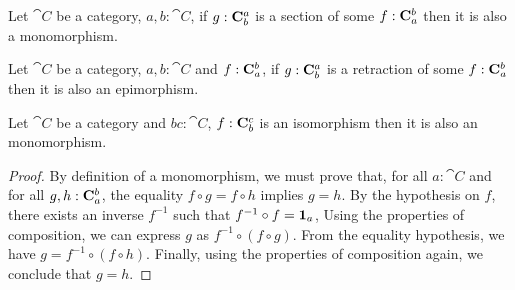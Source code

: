 \documentclass[12pt]{article}
\begin{document}
\begin{lemma}
    Let \(\cat{C}\) be a category, \(a,b:\cat{C}\),
    if \(g : \morphs{C}{b}{a}\) is a section of some \(f :\morphs{C}{a}{b}\) then it is also a monomorphism.
\end{lemma}

\begin{lemma}
    Let \(\cat{C}\) be a category, \(a,b:\cat{C}\) and \(f : \morphs{C} {a} {b}\),
    if \(g : \morphs{C} {b} {a}\) is a retraction of some \(f :\morphs{C}{a}{b}\) then it is also an epimorphism.
\end{lemma}

\begin{lemma}
    Let \(\cat{C}\) be a category and \(b c:\cat{C}\), \(f : \morphs{C} {b} {c}\) 
    is an isomorphism then it is also an monomorphism.
\end{lemma}
\begin{proof}
    By definition of a monomorphism, we must prove that, for all \(a:\cat{C}\) and for all \(g, h:\morphs{C}{a}{b}\),
    the equality \(f \circ g = f \circ h\) implies \(g = h\).
    By the hypothesis on \(f\), there exists an inverse \(f^{-1}\) such that \(f^{-1}\circ f = \idarrow[a]\), Using the properties of composition, we can express \(g\) as \(f^{-1} \circ (f \circ g)\).
    From the equality hypothesis, we have \(g = f^{-1} \circ (f \circ h)\).
    Finally, using the properties of composition again, we conclude that $g = h$.
\end{proof}
\end{document}
